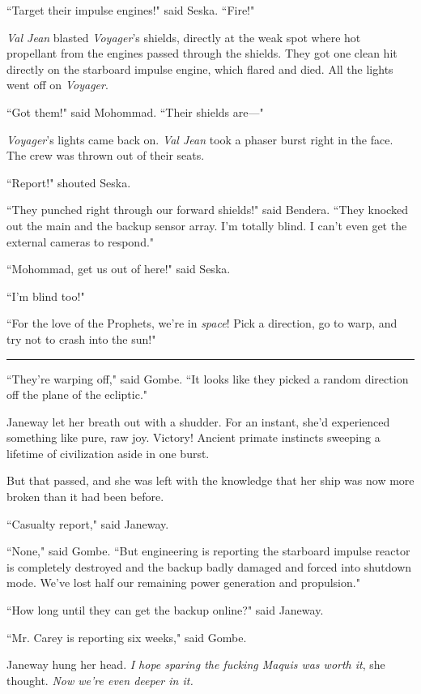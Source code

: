 \documentclass[twoside,letterpaper,12pt]{memoir}
\begin{document}
``Target their impulse engines!" said Seska. ``Fire!"

\textit{Val Jean} blasted \textit{Voyager}'s shields, directly at the weak spot where hot propellant from the engines passed through the shields. They got one clean hit directly on the starboard impulse engine, which flared and died. All the lights went off on \textit{Voyager}.

``Got them!" said Mohommad. ``Their shields are---"

\textit{Voyager}'s lights came back on. \textit{Val Jean} took a phaser burst right in the face. The crew was thrown out of their seats.

``Report!" shouted Seska.

``They punched right through our forward shields!" said Bendera. ``They knocked out the main and the backup sensor array. I'm totally blind. I can't even get the external cameras to respond."

``Mohommad, get us out of here!" said Seska.

``I'm blind too!"

``For the love of the Prophets, we're in \textit{space}! Pick a direction, go to warp, and try not to crash into the sun!"

\begin{center}\rule{3cm}{0.4 pt}\end{center}

\noindent ``They're warping off," said Gombe. ``It looks like they picked a random direction off the plane of the ecliptic."

Janeway let her breath out with a shudder. For an instant, she'd experienced something like pure, raw joy. Victory! Ancient primate instincts sweeping a lifetime of civilization aside in one burst.

But that passed, and she was left with the knowledge that her ship was now more broken than it had been before.

``Casualty report," said Janeway.

``None," said Gombe. ``But engineering is reporting the starboard impulse reactor is completely destroyed and the backup badly damaged and forced into shutdown mode. We've lost half our remaining power generation and propulsion."

``How long until they can get the backup online?" said Janeway.

``Mr. Carey is reporting six weeks," said Gombe.

Janeway hung her head. \textit{I hope sparing the fucking Maquis was worth it}, she thought. \textit{Now we're even deeper in it.}
\end{document}
